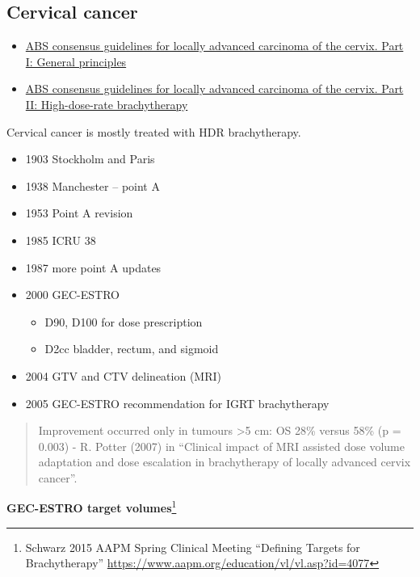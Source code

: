 \documentclass[]{book}
\providecommand{\tightlist}{%
  \setlength{\itemsep}{0pt}\setlength{\parskip}{0pt}}
\let\rmarkdownfootnote\footnote%
\def\footnote{\protect\rmarkdownfootnote}
\theoremstyle{definition}
\theoremstyle{definition}
\theoremstyle{definition}
\theoremstyle{remark}
\begin{document}
\subsection{Cervical cancer}\label{cervical}

\begin{itemize}
\tightlist
\item
  \href{}{ABS consensus guidelines for locally advanced carcinoma of the
  cervix. Part I: General principles}
\item
  \href{https://www.sciencedirect.com/science/article/pii/S1538472111003515}{ABS
  consensus guidelines for locally advanced carcinoma of the cervix.
  Part II: High-dose-rate brachytherapy}
\end{itemize}

Cervical cancer is mostly treated with HDR brachytherapy.

\begin{itemize}
\tightlist
\item
  1903 Stockholm and Paris
\item
  1938 Manchester -- point A
\item
  1953 Point A revision
\item
  1985 ICRU 38
\item
  1987 more point A updates
\item
  2000 GEC-ESTRO

  \begin{itemize}
  \tightlist
  \item
    D90, D100 for dose prescription
  \item
    D2cc bladder, rectum, and sigmoid
  \end{itemize}
\item
  2004 GTV and CTV delineation (MRI)
\item
  2005 GEC-ESTRO recommendation for IGRT brachytherapy
\end{itemize}

\begin{quote}
Improvement occurred only in tumours \textgreater{}5 cm: OS 28\% versus
58\% (p = 0.003) - R. Potter (2007) in ``Clinical impact of MRI assisted
dose volume adaptation and dose escalation in brachytherapy of locally
advanced cervix cancer''.
\end{quote}

\textbf{GEC-ESTRO target volumes}\footnote{Schwarz 2015 AAPM Spring
  Clinical Meeting ``Defining Targets for Brachytherapy''
  \url{https://www.aapm.org/education/vl/vl.asp?id=4077}}
\end{document}
